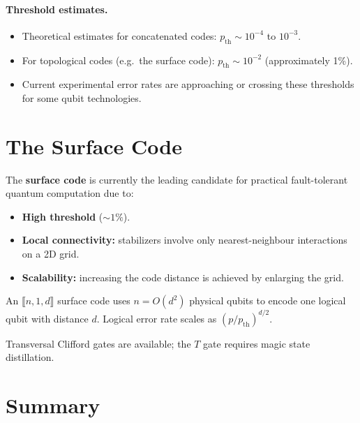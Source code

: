 \documentclass[11pt]{article}
\theoremstyle{definition}
\begin{document}
\paragraph{Threshold estimates.}
\begin{itemize}
    \item Theoretical estimates for concatenated codes: $p_{\mathrm{th}}\sim 10^{-4}$ to $10^{-3}$.
    \item For topological codes (e.g.\ the surface code): $p_{\mathrm{th}}\sim 10^{-2}$ (approximately 1\%).
    \item Current experimental error rates are approaching or crossing these thresholds for some qubit technologies.
\end{itemize}

\section{The Surface Code}

The \textbf{surface code} is currently the leading candidate for practical fault-tolerant quantum computation due to:

\begin{itemize}
    \item \textbf{High threshold} ($\sim 1\%$).
    \item \textbf{Local connectivity:} stabilizers involve only nearest-neighbour interactions on a 2D grid.
    \item \textbf{Scalability:} increasing the code distance is achieved by enlarging the grid.
\end{itemize}

An $\llbracket n,1,d\rrbracket$ surface code uses $n=O(d^2)$ physical qubits to encode one logical qubit with distance $d$.  Logical error rate scales as $(p/p_{\mathrm{th}})^{d/2}$.

Transversal Clifford gates are available; the $T$ gate requires magic state distillation.

\section{Summary}
\end{document}
